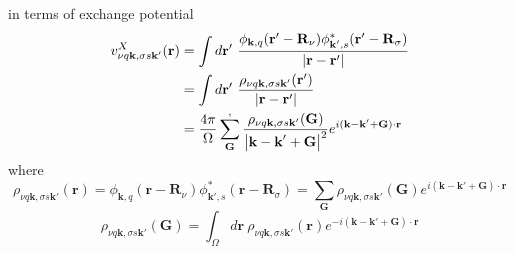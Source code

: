 \documentclass{article}
\begin{document}
            in terms of exchange potential
            \begin{align}
                v_{\nu q\textbf{k},\sigma s\textbf{k}'}^X(\textbf{r}) 
                &= \int d\textbf{r}'\ \frac{\phi_{\textbf{k},q}(\textbf{r}'-\textbf{R}_{\nu})\phi_{\textbf{k}',s}^*(\textbf{r}'-\textbf{R}_{\sigma})}{\left|\textbf{r}-\textbf{r}'\right|}\notag\\
                &= \int d\textbf{r}'\ \frac{\rho_{\nu q\textbf{k},\sigma s\textbf{k}'}(\textbf{r}')}{\left|\textbf{r}-\textbf{r}'\right|}\notag \\
                &= \frac{4\pi}{\Omega}\sum_{\textbf{G}}^{,}\frac{\rho_{\nu q\textbf{k},\sigma s\textbf{k}'}(\textbf{G})}{\left|\textbf{k}-\textbf{k}'+\textbf{G}\right|^2}e^{i(\textbf{k}-\textbf{k}'+\textbf{G})\cdot\textbf{r}}
            \end{align}
            where
            \begin{equation}
                \rho_{\nu q\textbf{k},\sigma s\textbf{k}'}(\textbf{r}) = \phi_{\textbf{k},q}(\textbf{r}-\textbf{R}_{\nu})\phi_{\textbf{k}',s}^*(\textbf{r}-\textbf{R}_{\sigma}) = \sum_{\textbf{G}}\rho_{\nu q\textbf{k},\sigma s\textbf{k}'}(\textbf{G})e^{i(\textbf{k}-\textbf{k}'+\textbf{G})\cdot\textbf{r}}
            \end{equation}
            \begin{equation}
                \rho_{\nu q\textbf{k},\sigma s\textbf{k}'}(\textbf{G}) = \int_{\Omega}d\textbf{r}\ \rho_{\nu q\textbf{k},\sigma s\textbf{k}'}(\textbf{r})e^{-i(\textbf{k}-\textbf{k}'+\textbf{G})\cdot\textbf{r}}
            \end{equation}

            
\end{document}

